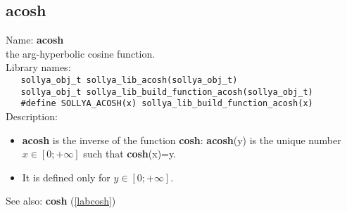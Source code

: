 \subsection{acosh}
\label{labacosh}
\noindent Name: \textbf{acosh}\\
\phantom{aaa}the arg-hyperbolic cosine function.\\[0.2cm]
\noindent Library names:\\
\verb|   sollya_obj_t sollya_lib_acosh(sollya_obj_t)|\\
\verb|   sollya_obj_t sollya_lib_build_function_acosh(sollya_obj_t)|\\
\verb|   #define SOLLYA_ACOSH(x) sollya_lib_build_function_acosh(x)|\\[0.2cm]
\noindent Description: \begin{itemize}

\item \textbf{acosh} is the inverse of the function \textbf{cosh}: \textbf{acosh}(y) is the unique number 
   $x \in [0; +\infty]$ such that \textbf{cosh}(x)=y.

\item It is defined only for $y \in [0;+\infty]$.
\end{itemize}
See also: \textbf{cosh} (\ref{labcosh})
